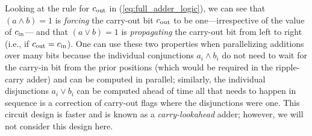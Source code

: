 Looking at the rule for $c_{\mathrm{out}}$ in (\ref{eq:full_adder_logic}), we can see that $(a \land b) = 1$ is {\em forcing} the carry-out bit $c_{\mathrm{out}}$ to be one---irrespective of the value of $c_{\mathrm{in}}$--- and that $(a \lor b) = 1$ is {\em propagating} the carry-out bit from left to right (i.e., if $c_{\mathrm{out}} = c_{\mathrm{in}}$). One can use these two properties when parallelizing additions over many bits because the individual conjunctions $a_i \land b_i$ do not need to wait for the carry-in bit from the prior positions (which would be required in the ripple-carry adder) and can be computed in parallel; similarly, the individual disjunctions $a_i \lor b_i$ can be computed ahead of time all that needs to happen in sequence is a correction of carry-out flags where the disjunctions were one. This circuit design is faster and is known as a {\em carry-lookahead} adder; however, we will not consider this design here.

